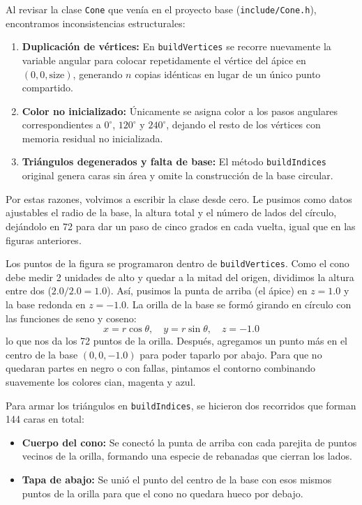 Al revisar la clase \texttt{Cone} que venía en el proyecto base (\texttt{include/Cone.h}), encontramos inconsistencias estructurales:
\begin{enumerate}
    \item \textbf{Duplicación de vértices:} En \texttt{buildVertices} se recorre nuevamente la variable angular para colocar repetidamente el vértice del ápice en $(0, 0, \text{size})$, generando $n$ copias idénticas en lugar de un único punto compartido.
    \item \textbf{Color no inicializado:} Únicamente se asigna color a los pasos angulares correspondientes a $0^\circ$, $120^\circ$ y $240^\circ$, dejando el resto de los vértices con memoria residual no inicializada.
    \item \textbf{Triángulos degenerados y falta de base:} El método \texttt{buildIndices} original genera caras sin área y omite la construcción de la base circular.
\end{enumerate}

Por estas razones, volvimos a escribir la clase desde cero. Le pusimos como datos ajustables el radio de la base, la altura total y el número de lados del círculo, dejándolo en 72 para dar un paso de cinco grados en cada vuelta, igual que en las figuras anteriores.

Los puntos de la figura se programaron dentro de \texttt{buildVertices}. Como el cono debe medir 2 unidades de alto y quedar a la mitad del origen, dividimos la altura entre dos ($2.0 / 2.0 = 1.0$). Así, pusimos la punta de arriba (el ápice) en $z = 1.0$ y la base redonda en $z = -1.0$. La orilla de la base se formó girando en círculo con las funciones de seno y coseno:
\begin{equation}
    x = r \cos\theta, \quad y = r \sin\theta, \quad z = -1.0
\end{equation}
lo que nos da los 72 puntos de la orilla. Después, agregamos un punto más en el centro de la base $(0, 0, -1.0)$ para poder taparlo por abajo. Para que no quedaran partes en negro o con fallas, pintamos el contorno combinando suavemente los colores cian, magenta y azul.

Para armar los triángulos en \texttt{buildIndices}, se hicieron dos recorridos que forman 144 caras en total:
\begin{itemize}
    \item \textbf{Cuerpo del cono:} Se conectó la punta de arriba con cada parejita de puntos vecinos de la orilla, formando una especie de rebanadas que cierran los lados.
    \item \textbf{Tapa de abajo:} Se unió el punto del centro de la base con esos mismos puntos de la orilla para que el cono no quedara hueco por debajo.
\end{itemize}

